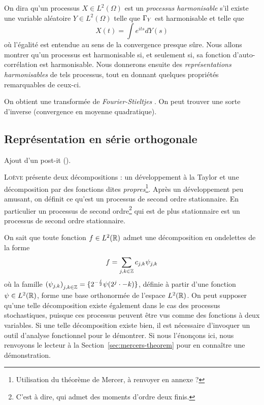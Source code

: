 
On dira qu'un processus $X\in L^2(\Omega)$ est un \emph{processus
  harmonisable} s'il existe une variable aléatoire $Y\in L^2(\Omega)$
telle que $\Gamma_Y$ est harmonisable et telle que
\begin{equation}
  \label{eqn:rep-harm-proc}
  X(t) = \int e^{its} dY(s)
\end{equation}
où l'égalité est entendue au sens de la convergence presque sûre. Nous
allons montrer qu'un processus est harmonisable si, et seulement si,
sa fonction d'auto-corrélation est harmonisable. Nous donnerons
ensuite des \emph{représentations harmonisables} de tels processus,
tout en donnant quelques propriétés remarquables de ceux-ci.

\begin{alert}
  On obtient une \og transformée de \emph{Fourier-Stieltjes} \fg{}. On
  peut trouver une sorte d'inverse (convergence en moyenne
  quadratique).
\end{alert}

\subsection{Représentation en série orthogonale}

\begin{alert}
  Ajout d'un post-it (\cite[p.~143]{loeve1978}).
\end{alert}

\textsc{Loève} présente deux décompositions : un développement à la
Taylor et une décomposition par des fonctions dites
\emph{propres}\footnote{Utilisation du théorème de Mercer, à renvoyer
  en annexe ?}. Après un développement peu amusant, on définit ce
qu'est un processus de second ordre stationnaire. En particulier un
processus de second ordre\footnote{C'est à dire, qui admet des moments
  d'ordre deux finis.} qui est de plus stationnaire est un processus de
second ordre stationnaire.

On sait que toute fonction $f\in L^2(\mathbb{R})$ admet une décomposition en
ondelettes de la forme
\begin{equation*}
  f = \sum_{j,k\in\mathbb{Z}} c_{j,k}\psi_{j,k}
\end{equation*}
où la famille
${(\psi_{j,k})}_{j,k\in\mathbb{Z}} = \{2^{-\frac{j}{2}}\psi(2^j\cdot-k)\}$,
définie à partir d'une fonction $\psi\in L^2(\mathbb{R})$, forme une base
orthonormée de l'espace $L^2(\mathbb{R})$. On peut supposer qu'une telle
décomposition existe également dans le cas des processus
stochastiques, puisque ces processus peuvent être vus comme des
fonctions à deux variables. Si une telle décomposition existe bien, il
est nécessaire d'invoquer un outil d'analyse fonctionnel pour le
démontrer. Si nous l'énonçons ici, nous renvoyons le lecteur à la
Section~\ref{sec:mercers-theorem} pour en connaître une démonstration.

